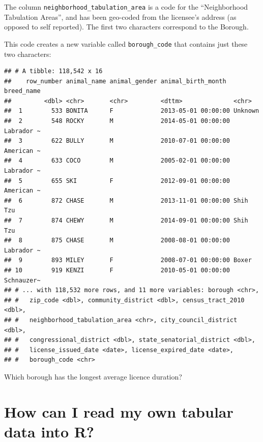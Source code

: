 \documentclass[]{Nemilov}
\newenvironment{Shaded}{\begin{snugshade}}{\end{snugshade}}
\newcommand{\DataTypeTok}[1]{\textcolor[rgb]{0.13,0.29,0.53}{#1}}
\newcommand{\DecValTok}[1]{\textcolor[rgb]{0.00,0.00,0.81}{#1}}
\newcommand{\KeywordTok}[1]{\textcolor[rgb]{0.13,0.29,0.53}{\textbf{#1}}}
\newcommand{\NormalTok}[1]{#1}
\newcommand{\OperatorTok}[1]{\textcolor[rgb]{0.81,0.36,0.00}{\textbf{#1}}}
\newcommand{\StringTok}[1]{\textcolor[rgb]{0.31,0.60,0.02}{#1}}
\begin{document}
The column \texttt{neighborhood\_tabulation\_area} is a code for the ``Neighborhood Tabulation Areas'', and has been geo-coded from the licensee's address (as opposed to self reported). The first two characters correspond to the Borough.

This code creates a new variable called \texttt{borough\_code} that contains just these two characters:

\begin{Shaded}
\end{Shaded}

\begin{verbatim}
## # A tibble: 118,542 x 16
##    row_number animal_name animal_gender animal_birth_month  breed_name
##         <dbl> <chr>       <chr>         <dttm>              <chr>     
##  1        533 BONITA      F             2013-05-01 00:00:00 Unknown   
##  2        548 ROCKY       M             2014-05-01 00:00:00 Labrador ~
##  3        622 BULLY       M             2010-07-01 00:00:00 American ~
##  4        633 COCO        M             2005-02-01 00:00:00 Labrador ~
##  5        655 SKI         F             2012-09-01 00:00:00 American ~
##  6        872 CHASE       M             2013-11-01 00:00:00 Shih Tzu  
##  7        874 CHEWY       M             2014-09-01 00:00:00 Shih Tzu  
##  8        875 CHASE       M             2008-08-01 00:00:00 Labrador ~
##  9        893 MILEY       F             2008-07-01 00:00:00 Boxer     
## 10        919 KENZI       F             2010-05-01 00:00:00 Schnauzer~
## # ... with 118,532 more rows, and 11 more variables: borough <chr>,
## #   zip_code <dbl>, community_district <dbl>, census_tract_2010 <dbl>,
## #   neighborhood_tabulation_area <chr>, city_council_district <dbl>,
## #   congressional_district <dbl>, state_senatorial_district <dbl>,
## #   license_issued_date <date>, license_expired_date <date>,
## #   borough_code <chr>
\end{verbatim}

Which borough has the longest average licence duration?

\hypertarget{how-can-i-read-my-own-tabular-data-into-r}{%
\section{How can I read my own tabular data into R?}\label{how-can-i-read-my-own-tabular-data-into-r}}
\end{document}
